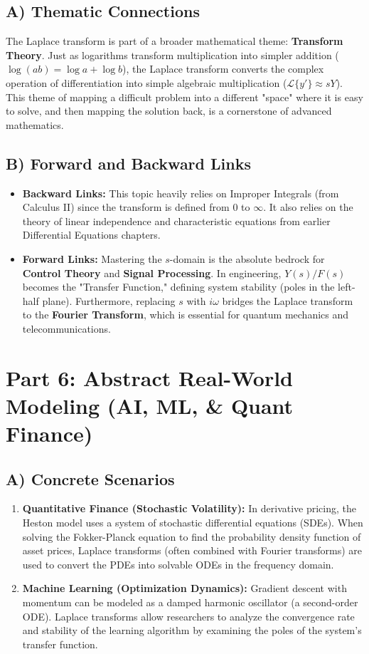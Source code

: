 \documentclass[11pt, letterpaper]{article}
\theoremstyle{definition}
\theoremstyle{remark}
\newcommand{\Lap}{\mathcal{L}}
\begin{document}
\subsection{A) Thematic Connections}
The Laplace transform is part of a broader mathematical theme: \textbf{Transform Theory}. Just as logarithms transform multiplication into simpler addition ($\log(ab) = \log a + \log b$), the Laplace transform converts the complex operation of differentiation into simple algebraic multiplication ($\Lap\{y'\} \approx sY$). This theme of mapping a difficult problem into a different "space" where it is easy to solve, and then mapping the solution back, is a cornerstone of advanced mathematics.

\subsection{B) Forward and Backward Links}
\begin{itemize}
    \item \textbf{Backward Links:} This topic heavily relies on Improper Integrals (from Calculus II) since the transform is defined from $0$ to $\infty$. It also relies on the theory of linear independence and characteristic equations from earlier Differential Equations chapters.
    \item \textbf{Forward Links:} Mastering the $s$-domain is the absolute bedrock for \textbf{Control Theory} and \textbf{Signal Processing}. In engineering, $Y(s)/F(s)$ becomes the "Transfer Function," defining system stability (poles in the left-half plane). Furthermore, replacing $s$ with $i\omega$ bridges the Laplace transform to the \textbf{Fourier Transform}, which is essential for quantum mechanics and telecommunications.
\end{itemize}

\newpage
\section{Part 6: Abstract Real-World Modeling (AI, ML, \& Quant Finance)}

\subsection{A) Concrete Scenarios}
\begin{enumerate}
    \item \textbf{Quantitative Finance (Stochastic Volatility):} In derivative pricing, the Heston model uses a system of stochastic differential equations (SDEs). When solving the Fokker-Planck equation to find the probability density function of asset prices, Laplace transforms (often combined with Fourier transforms) are used to convert the PDEs into solvable ODEs in the frequency domain.
    \item \textbf{Machine Learning (Optimization Dynamics):} Gradient descent with momentum can be modeled as a damped harmonic oscillator (a second-order ODE). Laplace transforms allow researchers to analyze the convergence rate and stability of the learning algorithm by examining the poles of the system's transfer function.
\end{enumerate}
\end{document}
